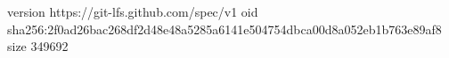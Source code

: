 version https://git-lfs.github.com/spec/v1
oid sha256:2f0ad26bac268df2d48e48a5285a6141e504754dbca00d8a052eb1b763e89af8
size 349692
